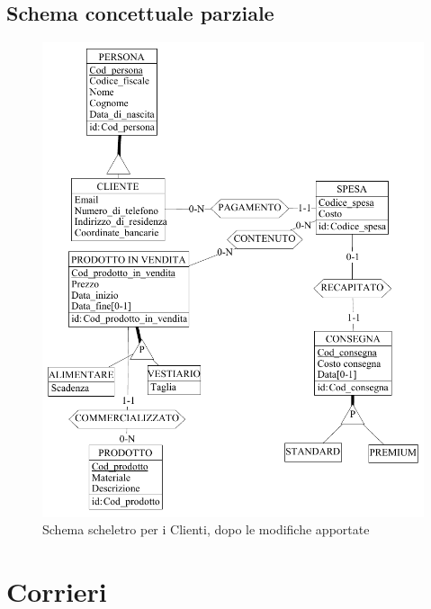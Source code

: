 \documentclass[a4paper,12pt]{report}
\begin{document}
\subsection{Schema concettuale parziale}
\begin{figure}[H]
	\centering{}
	\includegraphics[width=\textwidth]{img/SchemaConcettuale-Clienti2.pdf}
	\caption{Schema scheletro per i Clienti, dopo le modifiche apportate}
\end{figure}
\section{Corrieri}
\end{document}

